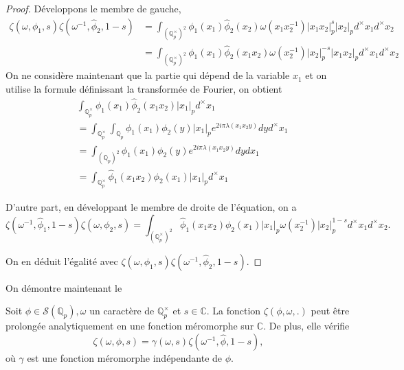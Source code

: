 \begin{proof}
Développons le membre de gauche,
\begin{align}
\zeta(\omega, \phi_1, s)\zeta(\omega^{-1}, \hat{\phi}_2, 1-s) &= \int_{{(\mathbb{Q}_p^\times)}^2} \phi_1(x_1)\hat{\phi}_2(x_2)\omega(x_1x_2^{-1})|x_1x_2|_p^s|x_2|_p d^\times x_1 d^\times x_2 \\
&= \int_{{(\mathbb{Q}_p^\times)}^2} \phi_1(x_1)\hat{\phi}_2(x_1x_2)\omega(x_2^{-1})|x_2|_p^{-s}|x_1x_2|_p d^\times x_1 d^\times x_2
\end{align}
On ne considère maintenant que la partie qui dépend de la variable $x_1$ et on utilise la formule définissant la transformée de Fourier, on obtient
\begin{align}
&\int_{\mathbb{Q}_p^\times} \phi_1(x_1)\hat{\phi}_2(x_1x_2)|x_1|_p d^\times x_1 \\
&=\int_{\mathbb{Q}_p^\times} \int_{\mathbb{Q}_p} \phi_1(x_1) \phi_2(y)|x_1|_p e^{2i\pi \lambda(x_1x_2 y)} dy d^\times x_1 \\
&= \int_{{(\mathbb{Q}_p)}^2} \phi_1(x_1)\phi_2(y) e^{2i\pi \lambda(x_1x_2 y)} dy dx_1 \\
&= \int_{\mathbb{Q}_p^\times} \hat{\phi}_1(x_1x_2)\phi_2(x_1)|x_1|_p d^\times x_1
\end{align}

D'autre part, en développant le membre de droite de l'équation, on a
\begin{equation}
\zeta(\omega^{-1}, \hat{\phi}_1, 1-s)\zeta(\omega, \phi_2, s) =  \int_{{(\mathbb{Q}_p^\times)}^2} \hat{\phi}_1(x_1x_2)\phi_2(x_1)|x_1|_p \omega(x_2^{-1})|x_2|_p^{1-s} d^\times x_1 d^\times x_2.
\end{equation}

On en déduit l'égalité avec $\zeta(\omega, \phi_1, s)\zeta(\omega^{-1}, \hat{\phi}_2, 1-s)$.
\end{proof}

On démontre maintenant le
\begin{theoreme}
Soit $\phi \in \mathcal{S}(\mathbb{Q}_p), \omega$ un caractère de $\mathbb{Q}_p^\times$ et $s \in \mathbb{C}$. La fonction $\zeta(\phi, \omega, .)$ peut être prolongée analytiquement en une fonction méromorphe sur $\mathbb{C}$. De plus, elle vérifie
\begin{equation}
\label{eq_gl1}
\zeta(\omega,\phi, s)=\gamma(\omega, s)\zeta(\omega^{-1}, \hat{\phi},  1-s),
\end{equation}
où $\gamma$ est une fonction méromorphe indépendante de $\phi$.
\end{theoreme}

